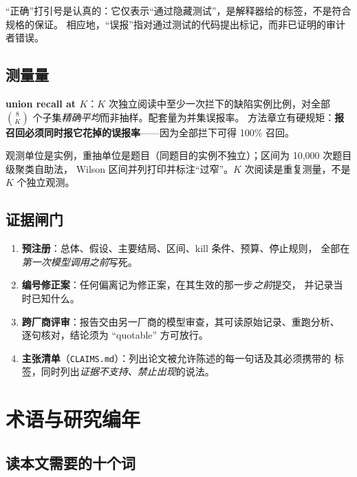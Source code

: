 \documentclass[11pt,a4paper]{article}
\begin{document}
“正确”打引号是认真的：它仅表示“通过隐藏测试”，是解释器给的标签，不是符合规格的保证。
相应地，“误报”指对通过测试的代码提出标记，而非已证明的审计者错误。

\subsection{测量量}

\textbf{union recall at $K$}：$K$ 次独立阅读中至少一次拦下的缺陷实例比例，对全部
$\binom{8}{K}$ 个子集\emph{精确平均}而非抽样。配套量为并集误报率。
方法章立有硬规矩：\textbf{报召回必须同时报它花掉的误报率}——因为全部拦下可得 100\% 召回。

观测单位是实例，重抽单位是题目（同题目的实例不独立）；区间为 10{,}000 次题目级聚类自助法，
Wilson 区间并列打印并标注“过窄”。$K$ 次阅读是重复测量，不是 $K$ 个独立观测。

\subsection{证据闸门}

\begin{enumerate}[label=\textbf{\arabic*.}]
\item \textbf{预注册}：总体、假设、主要结局、区间、kill 条件、预算、停止规则，
      全部在\emph{第一次模型调用之前}写死。
\item \textbf{编号修正案}：任何偏离记为修正案，在其生效的那一步\emph{之前}提交，
      并记录当时已知什么。
\item \textbf{跨厂商评审}：报告交由另一厂商的模型审查，其可读原始记录、重跑分析、
      逐句核对，结论须为 “quotable” 方可放行。
\item \textbf{主张清单}（\texttt{CLAIMS.md}）：列出论文被允许陈述的每一句话及其必须携带的
      标签，同时列出\emph{证据不支持、禁止出现}的说法。
\end{enumerate}

\section{术语与研究编年}

\subsection{读本文需要的十个词}
\end{document}
